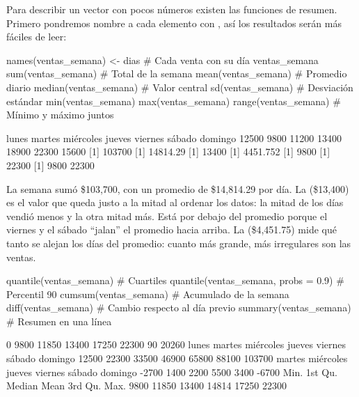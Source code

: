 Para describir un vector con pocos números existen las funciones de
resumen. Primero pondremos nombre a cada elemento con , así
los resultados serán más fáciles de leer:

\begin{rcode}
names(ventas_semana) <- dias      # Cada venta con su día
ventas_semana
sum(ventas_semana)                # Total de la semana
mean(ventas_semana)               # Promedio diario
median(ventas_semana)             # Valor central
sd(ventas_semana)                 # Desviación estándar
min(ventas_semana)
max(ventas_semana)
range(ventas_semana)              # Mínimo y máximo juntos
\end{rcode}
\begin{rsalida}
    lunes    martes miércoles    jueves   viernes    sábado   domingo 
    12500      9800     11200     13400     18900     22300     15600 
[1] 103700
[1] 14814.29
[1] 13400
[1] 4451.752
[1] 9800
[1] 22300
[1]  9800 22300
\end{rsalida}

La semana sumó \$103,700, con un promedio de \$14,814.29 por día. La
 (\$13,400) es el valor que queda justo a la mitad al
ordenar los datos: la mitad de los días vendió menos y la otra mitad más.
Está por debajo del promedio porque el viernes y el sábado ``jalan'' el
promedio hacia arriba. La  (\$4,451.75) mide qué
tanto se alejan los días del promedio: cuanto más grande, más irregulares
son las ventas.

\begin{rcode}
quantile(ventas_semana)                    # Cuartiles
quantile(ventas_semana, probs = 0.9)       # Percentil 90
cumsum(ventas_semana)                      # Acumulado de la semana
diff(ventas_semana)                        # Cambio respecto al día previo
summary(ventas_semana)                     # Resumen en una línea
\end{rcode}
\begin{rsalida}
   0%
 9800 11850 13400 17250 22300 
  90%
20260 
    lunes    martes miércoles    jueves   viernes    sábado   domingo 
    12500     22300     33500     46900     65800     88100    103700 
   martes miércoles    jueves   viernes    sábado   domingo 
    -2700      1400      2200      5500      3400     -6700 
   Min. 1st Qu.  Median    Mean 3rd Qu.    Max. 
   9800   11850   13400   14814   17250   22300 
\end{rsalida}

